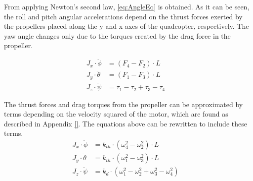 From applying Newton's second law, \autoref{eq:AngleEq} is obtained. As it can be seen, the roll and pitch angular accelerations depend on the thrust forces exerted by the propellers placed along the y and x axes of the quadcopter, respectively. The yaw angle changes only due to the torques created by the drag force in the propeller.

\begin{align}
	J_x\cdot\ddot{\phi}&=(F_4-F_2)\cdot L &\\
	J_y\cdot\ddot{\theta}&=(F_1-F_3)\cdot L &\\
	J_z\cdot\ddot{\psi}&=\tau_1-\tau_2+\tau_3-\tau_4
	\label{eq:AngleEq}
\end{align}
\begin{where}
\end{where}

The thrust forces and drag torques from the propeller can be approximated by terms depending on the velocity squared of the motor, which are found as described in Appendix \ref{}. The equations above can be rewritten to include these terms.
%
\begin{align}
J_x\cdot\ddot{\phi}&=k_{th} \cdot(\omega^2_4-\omega^2_2) \cdot L &\\
J_y \cdot\ddot{\theta}&=k_{th} \cdot(\omega^2_1-\omega^2_3) \cdot L &\\
J_z\cdot\ddot{\psi}&=k_d \cdot(\omega^2_1-\omega^2_2+\omega^2_3-\omega^2_4)
\label{eq:AngleEqVelocities}
\end{align}

